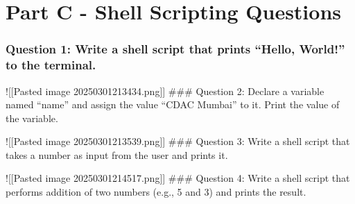\section{Part C - Shell Scripting
Questions}\label{part-c---shell-scripting-questions}

\subsubsection{Question 1: Write a shell script that prints ``Hello,
World!'' to the
terminal.}\label{question-1-write-a-shell-script-that-prints-hello-world-to-the-terminal.}

\begin{Shaded}
\begin{Highlighting}[]
 
\end{Highlighting}
\end{Shaded}

!{[}{[}Pasted image 20250301213434.png{]}{]} \#\#\# Question 2: Declare
a variable named ``name'' and assign the value ``CDAC Mumbai'' to it.
Print the value of the variable.

\begin{Shaded}
\begin{Highlighting}[]
\OperatorTok{=}
 
\end{Highlighting}
\end{Shaded}

!{[}{[}Pasted image 20250301213539.png{]}{]} \#\#\# Question 3: Write a
shell script that takes a number as input from the user and prints it.

\begin{Shaded}
\begin{Highlighting}[]
   
 
\end{Highlighting}
\end{Shaded}

!{[}{[}Pasted image 20250301214517.png{]}{]} \#\#\# Question 4: Write a
shell script that performs addition of two numbers (e.g., 5 and 3) and
prints the result.

\begin{Shaded}
\begin{Highlighting}[]
\OperatorTok{=}
\OperatorTok{=}
\OperatorTok{=} \OperatorTok{+} 
 
\end{Highlighting}
\end{Shaded}

